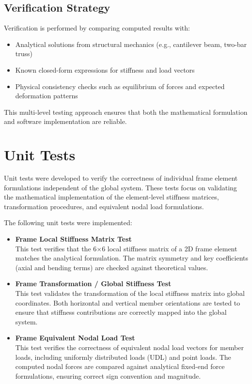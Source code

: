 \subsection*{Verification Strategy}

Verification is performed by comparing computed results with:

\begin{itemize}
    \item Analytical solutions from structural mechanics (e.g., cantilever beam, two-bar truss)
    \item Known closed-form expressions for stiffness and load vectors
    \item Physical consistency checks such as equilibrium of forces and expected deformation patterns
\end{itemize}

This multi-level testing approach ensures that both the mathematical formulation and software implementation are reliable.

\section{Unit Tests}

Unit tests were developed to verify the correctness of individual frame element formulations independent of the global system. These tests focus on validating the mathematical implementation of the element-level stiffness matrices, transformation procedures, and equivalent nodal load formulations.

The following unit tests were implemented:
\begin{itemize}
    \item \textbf{Frame Local Stiffness Matrix Test} \\
    This test verifies that the 6$\times$6 local stiffness matrix of a 2D frame element matches the analytical formulation. The matrix symmetry and key coefficients (axial and bending terms) are checked against theoretical values.
    \item \textbf{Frame Transformation / Global Stiffness Test} \\
    This test validates the transformation of the local stiffness matrix into global coordinates. Both horizontal and vertical member orientations are tested to ensure that stiffness contributions are correctly mapped into the global system.
    \item \textbf{Frame Equivalent Nodal Load Test} \\
    This test verifies the correctness of equivalent nodal load vectors for member loads, including uniformly distributed loads (UDL) and point loads. The computed nodal forces are compared against analytical fixed-end force formulations, ensuring correct sign convention and magnitude.
\end{itemize}

